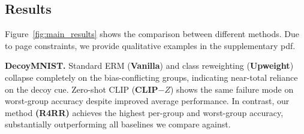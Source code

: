 \subsection{Results}\label{sec:results}

Figure~\ref{fig:main_results} shows the comparison between different methods. Due to page constraints, we provide qualitative examples in the supplementary pdf. 

\textbf{DecoyMNIST.} Standard ERM (\textbf{Vanilla}) and class reweighting (\textbf{Upweight}) collapse completely on the bias-conflicting groups, indicating near-total reliance on the decoy cue. Zero-shot CLIP (\textbf{CLIP$-{Z}$}) shows the same failure mode on worst-group accuracy despite improved average performance. In contrast, our method \textbf{(R4RR)} achieves the highest per-group and worst-group accuracy, substantially outperforming all baselines we compare against. 


